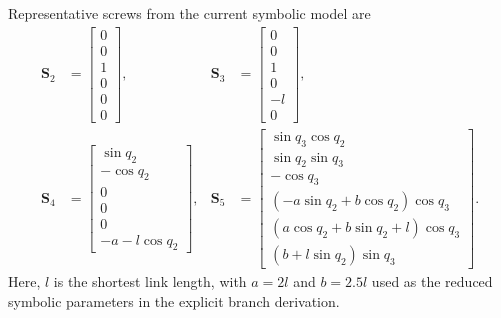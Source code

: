 ﻿\documentclass[a4paper,fleqn]{cas-sc}
\begin{document}
Representative screws from the current symbolic model are
\begin{equation}
\begin{aligned}
\mathbf S_2&=\begin{bmatrix}0\\0\\1\\0\\0\\0\end{bmatrix},&
\mathbf S_3&=\begin{bmatrix}0\\0\\1\\0\\-l\\0\end{bmatrix},\\
\mathbf S_4&=\begin{bmatrix}
\sin q_2\\-\cos q_2\\0\\0\\0\\-a-l\cos q_2
\end{bmatrix},&
\mathbf S_5&=\begin{bmatrix}
\sin q_3\cos q_2\\
\sin q_2\sin q_3\\
-\cos q_3\\
(-a\sin q_2+b\cos q_2)\cos q_3\\
(a\cos q_2+b\sin q_2+l)\cos q_3\\
(b+l\sin q_2)\sin q_3
\end{bmatrix}.
\end{aligned}
\label{eq:representative_screws}
\end{equation}
Here, \(l\) is the shortest link length, with \(a=2l\) and \(b=2.5l\) used
as the reduced symbolic parameters in the explicit branch derivation.
\end{document}
